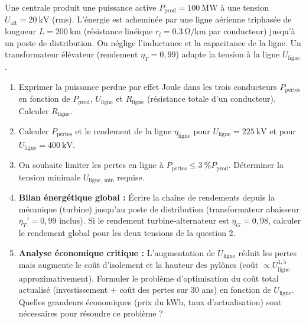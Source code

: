 \documentclass[11pt]{article}
\begin{document}
\begin{exercice}
Une centrale produit une puissance active $P_{\text{prod}} = \SI{100}{\mega\watt}$ à une tension $U_{\text{alt}} = \SI{20}{\kilo\volt}$ (rms). L'énergie est acheminée par une ligne aérienne triphasée de longueur $L = \SI{200}{\kilo\metre}$ (résistance linéique $r_l = \SI{0,3}{\ohm\per\kilo\metre}$ par conducteur) jusqu'à un poste de distribution. On néglige l'inductance et la capacitance de la ligne. Un transformateur élévateur (rendement $\eta_T = 0,99$) adapte la tension à la ligne $U_{\text{ligne}}$.
\begin{enumerate}
    \item Exprimer la puissance perdue par effet Joule dans les trois conducteurs $P_{\text{pertes}}$ en fonction de $P_{\text{prod}}$, $U_{\text{ligne}}$ et $R_{\text{ligne}}$ (résistance totale d'un conducteur). Calculer $R_{\text{ligne}}$.
    \item Calculer $P_{\text{pertes}}$ et le rendement de la ligne $\eta_{\text{ligne}}$ pour $U_{\text{ligne}} = \SI{225}{\kilo\volt}$ et pour $U_{\text{ligne}} = \SI{400}{\kilo\volt}$.
    \item On souhaite limiter les pertes en ligne à $P_{\text{pertes}} \le \SI{3}{\%} P_{\text{prod}}$. Déterminer la tension minimale $U_{\text{ligne, min}}$ requise.
    \item \textbf{Bilan énergétique global :} Écrire la chaîne de rendements depuis la mécanique (turbine) jusqu'au poste de distribution (transformateur abaisseur $\eta_T' = 0,99$ inclus). Si le rendement turbine-alternateur est $\eta_G = 0,98$, calculer le rendement global pour les deux tensions de la question 2.
    \item \textbf{Analyse économique critique :} L'augmentation de $U_{\text{ligne}}$ réduit les pertes mais augmente le coût d'isolement et la hauteur des pylônes (coût $\propto U_{\text{ligne}}^{1,5}$ approximativement). Formuler le problème d'optimisation du coût total actualisé (investissement + coût des pertes sur 30 ans) en fonction de $U_{\text{ligne}}$. Quelles grandeurs économiques (prix du kWh, taux d'actualisation) sont nécessaires pour résoudre ce problème ?
\end{enumerate}
\end{exercice}
\end{document}
